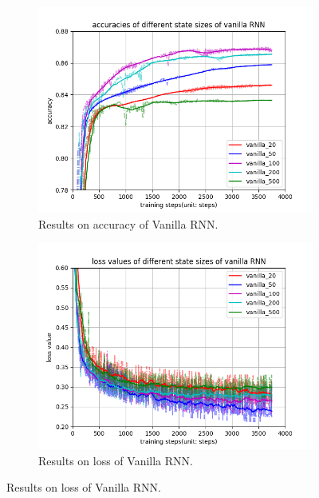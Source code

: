 \documentclass[12pt,letterpaper]{article}
\begin{document}
\begin{figure}[h]
    \begin{subfigure}{0.49\textwidth}
    \includegraphics[width=\linewidth]{vanilla_acc.png}
    \caption{\small Results on accuracy of Vanilla RNN.} \label{fig:a}
    \end{subfigure}\hspace*{\fill}
    \begin{subfigure}{0.49\textwidth}
    \includegraphics[width=\linewidth]{vanilla_loss.png}
    \caption{\small Results on loss of Vanilla RNN.} \label{fig:b}
    \end{subfigure}
    

\end{figure}
\end{document}
